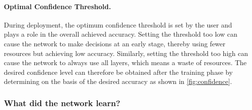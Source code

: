 \documentclass[conference]{IEEEtran}
\newcommand{\mynote}[3]{
    \fbox{\bfseries\sffamily\scriptsize#1}
    {\small$\blacktriangleright$\textsf{\emph{\color{#3}{#2}}}$\blacktriangleleft$}}
\newcommand{\todo}[1]{\mynote{TODO}{#1}{red}}
\begin{document}



\paragraph{Optimal Confidence Threshold.}
During deployment, the optimum confidence threshold is set by the user and plays a role in the overall achieved accuracy. Setting the threshold too low can cause the network to make decisions at an early stage, thereby using fewer resources but achieving low accuracy. Similarly, setting the threshold too high can cause the network to always use all layers, which means a waste of resources. The desired confidence level can therefore be obtained after the training phase by determining on the basis of the desired accuracy as shown in \autoref{fig:confidence}.


\subsubsection{What did the network learn?}
\end{document}
